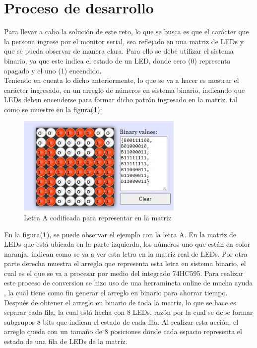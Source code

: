 \documentclass{article}
\begin{document}
\section{Proceso de desarrollo} \label{desarrollo}
Para llevar a cabo la solución de este reto, lo que se busca es que el carácter que la persona ingrese por el monitor serial, sea reflejado en una matriz de LEDs y que se pueda observar de manera clara. Para ello se debe utilizar el sistema binario, ya que este indica el estado de un LED, donde cero (0) representa apagado y el uno (1) encendido.\\

Teniendo en cuenta lo dicho anteriormente, lo que se va a hacer es mostrar el carácter ingresado, en un arreglo de números en  sistema binario, indicando que LEDs deben encenderse para formar dicho patrón ingresado en la matriz. tal como se muestre en la figura(\textbf{\ref{A}}):


    \begin{figure}[h]
    \includegraphics[width=8cm]{A.jpeg}
    \centering
    \caption{Letra A codificada para representar en la matriz}
    \label{A}
    \end{figure}

En la figura(\textbf{\ref{A}}), se puede observar el ejemplo con la letra A. En la matriz de LEDs que está ubicada en la parte izquierda, los números uno que están en color naranja, indican como se va a ver esta letra en la matriz real de LEDs. Por otra parte derecha muestra el arreglo que representa esta letra en sistema binario, el cual es el que se va a procesar por medio del integrado 74HC595. Para realizar este proceso de conversion se hizo uso de una herramineta online de mucha ayuda \cite{riyas}, la cual tiene como fin generar el arreglo en binario para ahorrar tiempo.\\

Después de obtener el arreglo en binario de toda la matriz, lo que se hace es separar cada fila, la cual está hecha con 8 LEDs, razón por la cual se debe formar subgrupos 8 bits  que indican el estado de cada fila. Al realizar esta acción, el arreglo queda con un tamaño de 8 posiciones donde cada espacio representa el estado de una fila de LEDs de la matriz.\\
\end{document}
